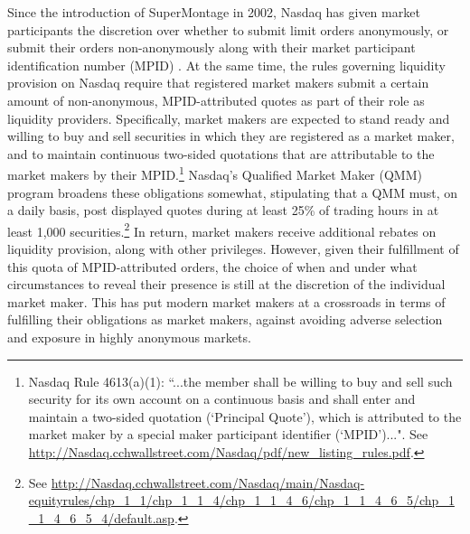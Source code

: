\documentclass{article}
\begin{document}

\noindent Since the introduction of SuperMontage in 2002, Nasdaq has given market participants the discretion over whether to submit limit orders anonymously, or submit their orders non-anonymously along with their market participant identification number (MPID) \citep{mizrach2006does}. At the same time, the rules governing liquidity provision on Nasdaq require that registered market makers submit a certain amount of non-anonymous, MPID-attributed quotes as part of their role as liquidity providers. Specifically, market makers are expected to stand ready and willing to buy and sell securities in which they are registered as a market maker, and to maintain continuous two-sided quotations that are attributable to the market makers by their MPID.\footnote{Nasdaq Rule 4613(a)(1): ``...the member shall be willing to buy and sell such security for its own account on a continuous basis and shall enter and maintain a two-sided quotation (`Principal Quote'), which is attributed to the market maker by a special maker participant identifier (`MPID')...". See \url{http://Nasdaq.cchwallstreet.com/Nasdaq/pdf/new_listing_rules.pdf}.} Nasdaq's Qualified Market Maker (QMM) program broadens these obligations somewhat, stipulating that a QMM must, on a daily basis, post displayed quotes during at least 25\% of trading hours in at least 1,000 securities.\footnote{See \url{http://Nasdaq.cchwallstreet.com/Nasdaq/main/Nasdaq-equityrules/chp_1_1/chp_1_1_4/chp_1_1_4_6/chp_1_1_4_6_5/chp_1_1_4_6_5_4/default.asp}.} In return, market makers receive additional rebates on liquidity provision, along with other privileges. However, given their fulfillment of this quota of MPID-attributed orders, the choice of when and under what circumstances to reveal their presence is still at the discretion of the individual market maker. This has put modern market makers at a crossroads in terms of fulfilling their obligations as market makers, against avoiding adverse selection and exposure in highly anonymous markets.
\end{document}
